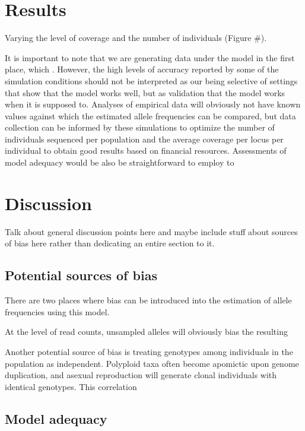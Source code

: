 \documentclass[11pt,english,letterpaper,oneside]{article}
\begin{document}
\section*{Results}               %

Varying the level of coverage and the number of individuals (Figure \#).
\medskip

It is important to note that we are generating data under the model in the first place, which . However, the high levels of accuracy reported by some of the simulation conditions should not be interpreted as our being selective of settings that show that the model works well, but as validation that the model works when it is supposed to. Analyses of empirical data will obviously not have known values against which the estimated allele frequencies can be compared, but data collection can be informed by these simulations to optimize the number of individuals sequenced per population and the average coverage per locus per individual to obtain good results based on financial resources. Assessments of model adequacy would be also be straightforward to employ to 
\medskip

\section*{Discussion}               %

Talk about general discussion points here and maybe include stuff about sources of bias here rather than dedicating an entire section to it.

\medskip
\subsection*{Potential sources of bias}
\medskip

There are two places where bias can be introduced into the estimation of allele frequencies using this model.
\medskip

At the level of read counts, unsampled alleles will obviously bias the resulting
\medskip

Another potential source of bias is treating genotypes among individuals in the population as independent. Polyploid taxa often become apomictic upon genome duplication, and asexual reproduction will generate clonal individuals with identical genotypes. This correlation 

\medskip
\subsection*{Model adequacy}
\medskip
\end{document}
